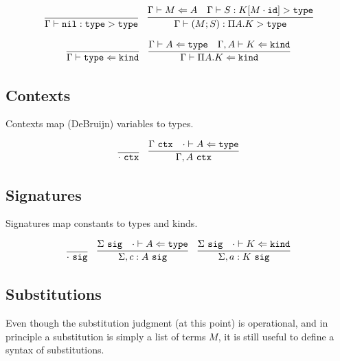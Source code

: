 \documentclass[11pt,twoside]{article}
\begin{document}
\bigskip 
{}
\bigskip 

$$
\begin{array}{lr}
\infer{\Focus{\Nil}{\Type}{\Type}}{} & 
\infer{\Focus{(M;S)}{\PiTyp{A}{K}}{\Type}}{\CheckTy{M}{A} & \Focus{S}{K[M\cdot\IdSub]}{\Type}}
\end{array} 
$$

\bigskip 
{}
\bigskip 

$$
\begin{array}{cc}
\infer{\CheckTy{\Type}{\Kind}}{} &
\infer{\CheckTy{\PiTyp{A}{K}}{\Kind}}{\CheckTy{A}{\Type} & \CheckTy[\Gamma,A]{K}{\Kind}}
\end{array} 
$$

\subsection{Contexts}

Contexts map (DeBruijn) variables to types.  

\newcommand{\Ctx}{\ \mathtt{ctx}}
\bigskip 
\framebox{$\Gamma\Ctx$}
\bigskip 

$$
\begin{array}{cc}
\infer{\cdot\Ctx}{} &
\infer{\Gamma,A\Ctx}{\Gamma\Ctx & \CheckTy[\cdot]{A}{\Type}}
\end{array} 
$$

\subsection{Signatures}

Signatures map constants to types and kinds.

\newcommand{\Sig}{\ \mathtt{sig}}
\bigskip 
\framebox{$\Sigma\Sig$}
\bigskip 

$$
\begin{array}{ccc}
\infer{\cdot\Sig}{}&
\infer{\Sigma,c:A\Sig}{\Sigma\Sig & \CheckTy[\cdot]{A}{\Type}}&
\infer{\Sigma,a:K\Sig}{\Sigma\Sig & \CheckTy[\cdot]{K}{\Kind}}
\end{array} 
$$


\subsection{Substitutions}

Even though the substitution judgment (at this point) is operational,
and in principle a substitution is simply a list of terms $M$,
it is still useful to define a syntax of substitutions.  
\end{document}
